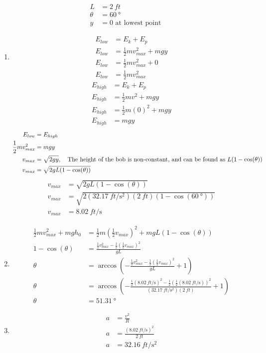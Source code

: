\documentclass{article}
\begin{document}
\begin{align*}
	L & = \SI{2}{ft} \\
	\theta & = \SI{60}{\degree} \\
	y & = 0 \text{ at lowest point}
\end{align*}
\begin{enumerate}[label = \textbf{(\alph*)}]
	\item
		\begin{align*}
			E_{low} & = E_k + E_p \\
			E_{low} & = \frac{1}{2}mv_{max}^2 + mgy \\
			E_{low} & = \frac{1}{2}mv_{max}^2 + 0 \\
			E_{low} & = \frac{1}{2}mv_{max}^2
		\end{align*}
		\begin{align*}
			E_{high} & = E_k + E_p \\
			E_{high} & = \frac{1}{2}mv^2 + mgy \\
			E_{high} & = \frac{1}{2}m(0)^2 + mgy \\
			E_{high} & = mgy
		\end{align*}
		\begin{align*}
			E_{low} & = E_{high} \\
			\frac{1}{2}mv_{max}^2 & = mgy \\
			v_{max} & = \sqrt{2gy}, \quad \text{The height of the bob is non-constant, and can be found as $ L(1 - \cos(\theta)) $} \\
			v_{max} & = \sqrt{2g L(1 - \cos(\theta))}
		\end{align*}
		\begin{align*}
			v_{max} & = \sqrt{2g L(1 - \cos(\theta))} \\
			v_{max} & = \sqrt{2(\SI{32.17}{ft \per \second \squared})(\SI{2}{ft})(1 - \cos(\SI{60}{\degree}))} \\
			v_{max} & = \SI{8.02}{ft \per \second}
		\end{align*}
	\item
		\begin{align*}
			\frac{1}{2}mv_{max}^2 + mgh_0 & = \frac{1}{2}m \left( \frac{1}{2}v_{max} \right)^2 + mgL(1 - \cos(\theta)) \\
			1 - \cos(\theta) & = \frac{\frac{1}{2}v_{max}^2 - \frac{1}{2}\left(\frac{1}{2}v_{max}\right)^2}{gL} \\
			\theta & = \arccos \left( -\frac{\frac{1}{2}v_{max}^2 - \frac{1}{2}\left(\frac{1}{2}v_{max}\right)^2}{gL} + 1 \right) \\
			\theta & = \arccos \left( -\frac{\frac{1}{2}(\SI{8.02}{ft \per \second})^2 - \frac{1}{2}\left(\frac{1}{2}(\SI{8.02}{ft \per \second})\right)^2}{(\SI{32.17}{ft \per \second \squared})(\SI{2}{ft})} + 1 \right) \\
			\theta & = \SI{51.31}{\degree}
		\end{align*}
	\item
		\begin{align*}
			a & = \frac{v^2}{R} \\
			a & = \frac{(\SI{8.02}{ft \per \second})^2}{\SI{2}{ft}} \\
			a & = \SI{32.16}{ft \per \second \squared}
		\end{align*}
\end{enumerate}
\end{document}
